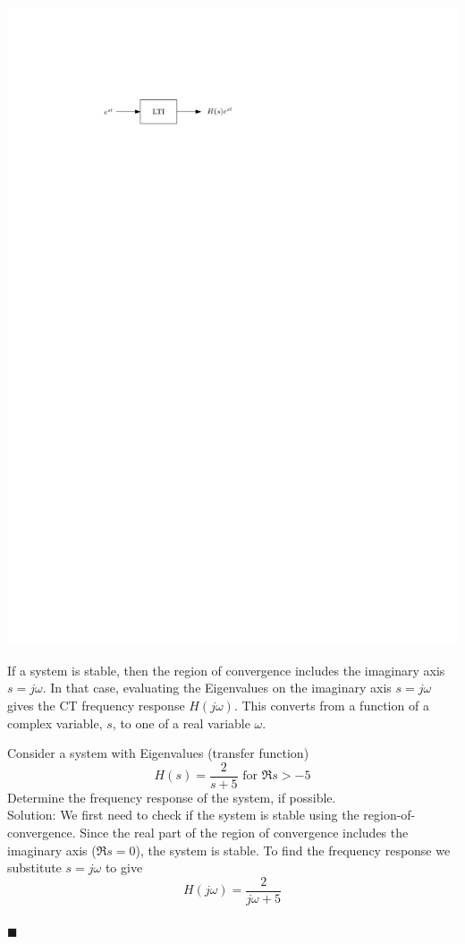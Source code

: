 \begin{center}
  \includegraphics[scale=1]{graphics/18-ct-tf.pdf}
\end{center}

If a system is stable, then the region of convergence includes the imaginary axis $s = j\omega$. In that case, evaluating the Eigenvalues on the imaginary axis $s = j\omega$ gives the CT frequency response $H(j\omega)$. This converts from a function of a complex variable, $s$, to one of a real variable $\omega$.

\begin{example} Consider a system with Eigenvalues (transfer function)
  \[
  H(s) = \frac{2}{s+5}\mbox{ for } \Re{s} > -5
  \]
  Determine the frequency response of the system, if possible.\\

  Solution: We first need to check if the system is stable using the region-of-convergence. Since the real part of the region of convergence includes the imaginary axis ($\Re s = 0$), the system is stable. To find the frequency response we substitute $s = j\omega$ to give
  \[
  H(j\omega) = \frac{2}{j\omega+5}
  \]
  \\$\blacksquare$
\end{example}

